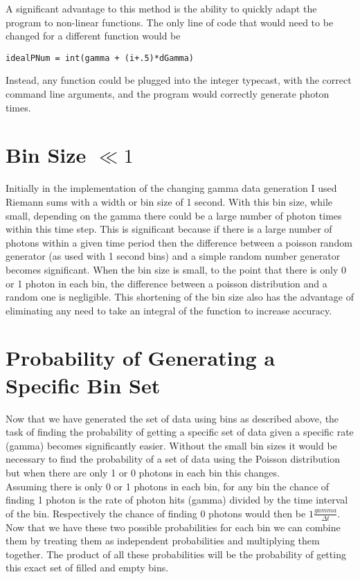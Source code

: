 \documentclass[aps,letterpaper,10pt]{revtex4}
\begin{document}
A significant advantage to this method is the ability to quickly adapt the program to non-linear functions. The only line of code that would need to be changed for a different function would be
\begin{verbatim}
idealPNum = int(gamma + (i+.5)*dGamma)
\end{verbatim}
Instead, any function could be plugged into the integer typecast, with the correct command line arguments, and the program would correctly generate photon times.

\vspace{3mm}


\section{Bin Size $\ll1$}
Initially in the implementation of the changing gamma data generation I used Riemann sums with a width or bin size of 1 second. With this bin size, while small, depending on the gamma there could be a large number of photon times within this time step. This is significant because if there is a large number of photons within a given time period then the difference between a poisson random generator (as used with 1 second bins) and a simple random number generator becomes significant. When the bin size is small, to the point that there is only 0 or 1 photon in each bin, the difference between a poisson distribution and a random one is negligible. This shortening of the bin size also has the advantage of eliminating any need to take an integral of the function to increase accuracy.


\section{Probability of Generating a Specific Bin Set}
Now that we have generated the set of data using bins as described above, the task of finding the probability of getting a specific set of data given a specific rate (gamma) becomes significantly easier. Without the small bin sizes it would be necessary to find the probability of a set of data using the Poisson distribution but when there are only 1 or 0 photons in each bin this changes.\\

Assuming there is only 0 or 1 photons in each bin, for any bin the chance of finding 1 photon is the rate of photon hits (gamma) divided by the time interval of the bin. Respectively the chance of finding 0 photons would then be $1\frac{gamma}{\Delta t}$. Now that we have these two possible probabilities for each bin we can combine them by treating them as independent probabilities and multiplying them together. The product of all these probabilities will be the probability of getting this exact set of filled and empty bins.\\
\end{document}

